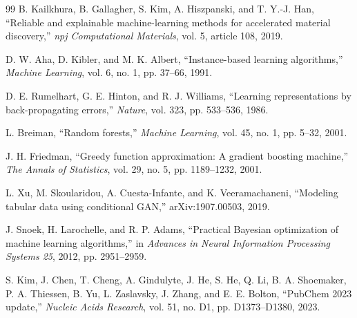 \documentclass[11pt]{article}
\begin{document}
\begin{thebibliography}{99}
B. Kailkhura, B. Gallagher, S. Kim, A. Hiszpanski, and T. Y.-J. Han,
``Reliable and explainable machine-learning methods for accelerated material discovery,''
\textit{npj Computational Materials}, vol. 5, article 108, 2019.

D. W. Aha, D. Kibler, and M. K. Albert,
``Instance-based learning algorithms,''
\textit{Machine Learning}, vol. 6, no. 1, pp. 37--66, 1991.

D. E. Rumelhart, G. E. Hinton, and R. J. Williams,
``Learning representations by back-propagating errors,''
\textit{Nature}, vol. 323, pp. 533--536, 1986.

L. Breiman,
``Random forests,''
\textit{Machine Learning}, vol. 45, no. 1, pp. 5--32, 2001.

J. H. Friedman,
``Greedy function approximation: A gradient boosting machine,''
\textit{The Annals of Statistics}, vol. 29, no. 5, pp. 1189--1232, 2001.

L. Xu, M. Skoularidou, A. Cuesta-Infante, and K. Veeramachaneni,
``Modeling tabular data using conditional GAN,''
arXiv:1907.00503, 2019.

J. Snoek, H. Larochelle, and R. P. Adams,
``Practical Bayesian optimization of machine learning algorithms,''
in \textit{Advances in Neural Information Processing Systems 25}, 2012, pp. 2951--2959.

S. Kim, J. Chen, T. Cheng, A. Gindulyte, J. He, S. He, Q. Li, B. A. Shoemaker, P. A. Thiessen, B. Yu, L. Zaslavsky, J. Zhang, and E. E. Bolton,
``PubChem 2023 update,''
\textit{Nucleic Acids Research}, vol. 51, no. D1, pp. D1373--D1380, 2023.

\end{thebibliography}
\end{document}
